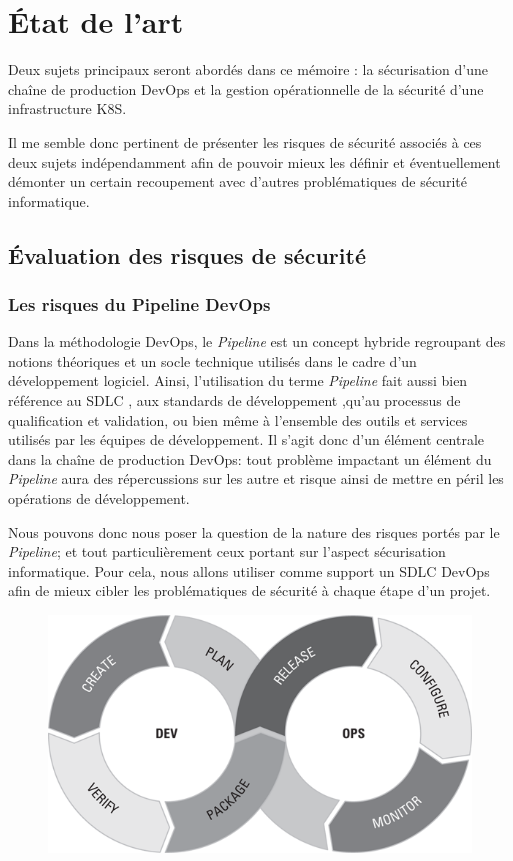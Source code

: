 \chapter{État de l'art}
Deux sujets principaux seront abordés dans ce mémoire : la sécurisation d'une chaîne de production DevOps et la 
gestion opérationnelle de la sécurité d'une infrastructure \ac{K8S}.

Il me semble donc pertinent de présenter les risques de sécurité associés à ces deux sujets indépendamment afin de 
pouvoir mieux les définir et éventuellement démonter un certain recoupement avec d'autres problématiques de sécurité 
informatique. 


\section{Évaluation des risques de sécurité}

\subsection{Les risques du Pipeline DevOps}
Dans la méthodologie DevOps, le \emph{Pipeline} est un concept hybride regroupant des notions théoriques et un socle 
technique utilisés dans le cadre d'un développement logiciel. Ainsi, l'utilisation du terme \emph{Pipeline} fait aussi 
bien référence au \ac{SDLC} \autocite[Ch.\ 6]{devops_for_dummies_freeman_forsgren_2019}, aux standards de développement
\autocite[Ch.\ 9]{devops_for_dummies_freeman_forsgren_2019},qu'au processus de qualification et validation, ou bien même
à l'ensemble des outils et services utilisés par les équipes de développement. 
\newline Il s'agit donc d'un élément centrale dans la chaîne de production DevOps: tout problème impactant un élément du 
\emph{Pipeline} aura des répercussions sur les autre et risque ainsi de mettre en péril les opérations de développement.

Nous pouvons donc nous poser la question de la nature des risques portés par le \emph{Pipeline}; et tout particulièrement
ceux portant sur l'aspect sécurisation informatique.
\newline Pour cela, nous allons utiliser comme support un \ac{SDLC} DevOps afin de mieux cibler les 
problématiques de sécurité à chaque étape d'un projet.

\vspace{0.5em}
\begin{figure}[h]
    \centering
    \includegraphics[width=0.5\linewidth]{resources/img/devops_lifecycle.png}
    \label{fig:devops-lifecycle}
\end{figure}
\newpage

